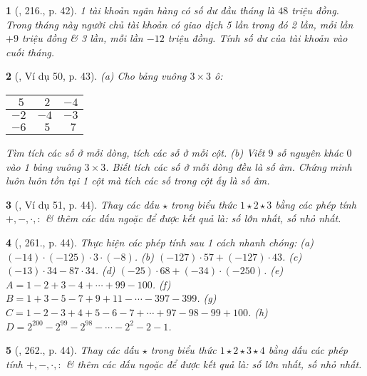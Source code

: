 \documentclass{article}
\newtheorem{baitoan}{}
\begin{document}
\begin{baitoan}[\cite{Tuyen_Toan_6}, 216., p. 42]
	1 tài khoản ngân hàng có số dư đầu tháng là $48$ triệu đồng. Trong tháng này người chủ tài khoản có giao dịch 5 lần trong đó 2 lần, mỗi lần $+9$ triệu đồng \& 3 lần, mỗi lần $-12$ triệu đồng. Tính số dư của tài khoản vào cuối tháng.
\end{baitoan}

\begin{baitoan}[\cite{Binh_Toan_6_tap_1}, Ví dụ 50, p. 43]
	(a) Cho bảng vuông $3\times 3$ ô:
	\begin{table}[H]
		\centering
		\begin{tabular}{|c|c|c|}
			\hline
			$\ \ 5$ & $\ \ 2$ & $-4$ \\
			\hline
			$-2$ & $-4$ & $-3$ \\
			\hline
			$-6$ & $\ \ 5$ & $\ \ 7$ \\
			\hline
		\end{tabular}
	\end{table}
	\noindent Tìm tích các số ở mỗi dòng, tích các số ở mỗi cột. (b) Viết $9$ số nguyên khác $0$ vào 1 bảng vuông $3\times 3$. Biết tích các số ở mỗi dòng đều là số âm. Chứng minh luôn luôn tồn tại 1 cột mà tích các số trong cột ấy là số âm.
\end{baitoan}

\begin{baitoan}[\cite{Binh_Toan_6_tap_1}, Ví dụ 51, p. 44]
	Thay các dấu $\star$ trong biểu thức $1\star2\star3$ bằng các phép tính $+,-,\cdot,:$ \& thêm các dấu ngoặc để được kết quả là: số lớn nhất, số nhỏ nhất.
\end{baitoan}

\begin{baitoan}[\cite{Binh_Toan_6_tap_1}, 261., p. 44]
	Thực hiện các phép tính sau 1 cách nhanh chóng: (a) $(-14)\cdot(-125)\cdot3\cdot(-8)$. (b) $(-127)\cdot57 + (-127)\cdot43$. (c) $(-13)\cdot34 - 87\cdot34$. (d) $(-25)\cdot68 + (-34)\cdot(-250)$. (e) $A = 1 - 2 + 3 - 4 + \cdots + 99 - 100$. (f) $B = 1 + 3 - 5 - 7 + 9 + 11 - \cdots - 397 - 399$. (g) $C = 1 - 2 - 3 + 4 + 5 - 6 - 7 + \cdots + 97 - 98 - 99 + 100$. (h) $D = 2^{200} - 2^{99} - 2^{98} - \cdots - 2^2 - 2 - 1$.
\end{baitoan}

\begin{baitoan}[\cite{Binh_Toan_6_tap_1}, 262., p. 44]
	Thay các dấu  $\star$ trong biểu thức $1\star2\star3\star4$ bằng dấu các phép tính $+,-,\cdot,:$ \& thêm các dấu ngoặc để được kết quả là: số lớn nhất, số nhỏ nhất.
\end{baitoan}
\end{document}
